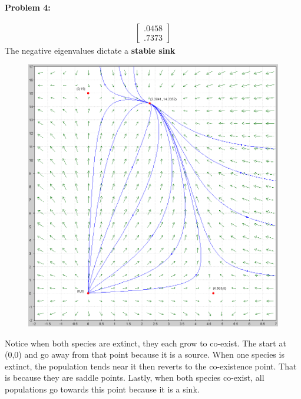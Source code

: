 \documentclass[11pt]{article}
\newcommand{\skipline}{\vspace{\baselineskip}}
\newenvironment{problem}[1]{\textbf{Problem #1: }}{\newpage}
\begin{document}
\begin{problem}{4}
\begin{enumerate}[label = (\alph*)]
\begin{enumerate}[label = (\roman*)]
\begin{align*}
\begin{bmatrix}
					.0458 \\ .7373
					\end{bmatrix}
				\end{align*}
				The negative eigenvalues dictate a \textbf{stable sink}
			\end{enumerate}
			\newpage
			\begin{figure}[h!]
				\centering
				\includegraphics[width = 16cm]{Prob4.png}
			\end{figure}
			\skipline
			\skipline
			Notice when both species are extinct, they each grow to co-exist.  The start at (0,0) and go away from that point because it is a source.  When one species is extinct, the population tends near it then reverts to the co-existence point.  That is because they are saddle points. Lastly, when both species co-exist, all populations go towards this point because it is a sink.
		\end{enumerate}
	\end{problem}
\end{document}
